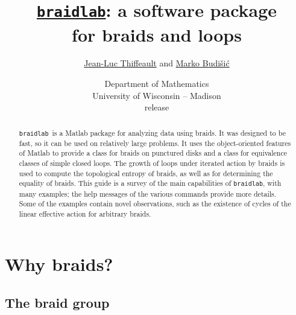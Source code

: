 \documentclass[12pt]{article}
\newcommand{\braidlab}{\texttt{braidlab}}%
\begin{document}
\lstset{language=Matlab}
\lstset{breaklines=true}

\lstset{%
basicstyle=\small\ttfamily,
keywordstyle=\small\ttfamily,
identifierstyle=,
commentstyle=\small\rmfamily\itshape,%
stringstyle=\small\ttfamily,
showstringspaces=false}


\title{\href{{http://github.com/jeanluct/braidlab}}{\braidlab}:
  a software package \\ for braids and loops}
\author{%
\href{http://www.math.wisc.edu/~jeanluc}{Jean-Luc Thiffeault}
  and
\href{http://mbudisic.wordpress.com}{Marko Budi\v{s}i\'{c}}
}
\date{{\small Department of Mathematics\\ University of
    Wisconsin -- Madison} \\[10pt]
  release } %

\maketitle

\begin{abstract}
  \braidlab\ is a Matlab package for analyzing data using braids.  It was
  designed to be fast, so it can be used on relatively large problems.  It
  uses the object-oriented features of Matlab to provide a class for braids on
  punctured disks and a class for equivalence classes of simple closed loops.
  The growth of loops under iterated action by braids is used to compute the
  topological entropy of braids, as well as for determining the equality of
  braids.  This guide is a survey of the main capabilities of \braidlab, with
  many examples; the help messages of the various commands provide more
  details.  Some of the examples contain novel observations, such as the
  existence of cycles of the linear effective action for arbitrary braids.
\end{abstract}

\tableofcontents


\section{Why braids?}

\subsection{The braid group}
\label{sec:braidgroup}
\end{document}

